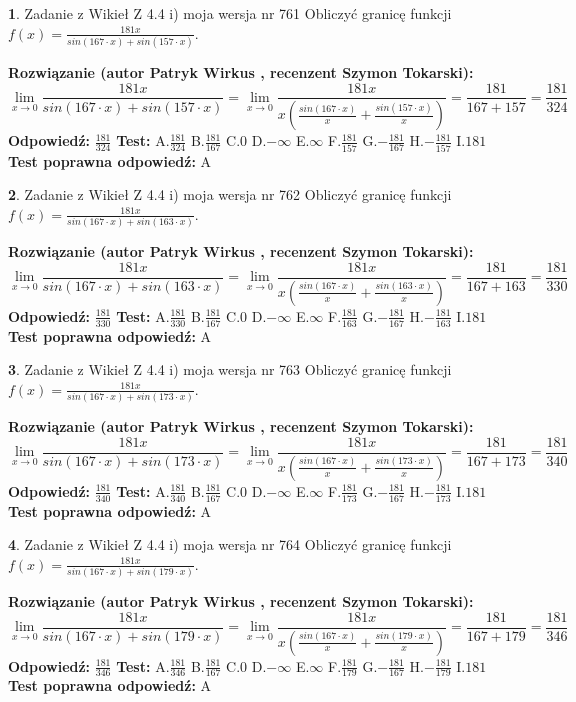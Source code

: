 \documentclass[12pt, a4paper]{article}
\theoremstyle{definition} %
\newtheorem{zad}{}
\newcommand{\zadStart}[1]{\begin{zad}#1\newline}
\newcommand{\zadStop}{\end{zad}}
\newcommand{\rozwStart}[2]{\noindent \textbf{Rozwiązanie (autor #1 , recenzent #2): }\newline}
\newcommand{\rozwStop}{\newline}
\newcommand{\odpStart}{\noindent \textbf{Odpowiedź:}\newline}
\newcommand{\odpStop}{\newline}
\newcommand{\testStart}{\noindent \textbf{Test:}\newline}
\newcommand{\testStop}{\newline}
\newcommand{\kluczStart}{\noindent \textbf{Test poprawna odpowiedź:}\newline}
\newcommand{\kluczStop}{\newline}
\begin{document}
\zadStart{Zadanie z Wikieł Z 4.4 i) moja wersja nr 761}
Obliczyć granicę funkcji $f(x)=\frac{181x}{sin(167\cdot x) +sin(157\cdot x)}$.
\zadStop
\rozwStart{Patryk Wirkus}{Szymon Tokarski}
$$\lim\limits_{x\to 0}\frac{181x}{sin(167\cdot x) +sin(157\cdot x)}=\lim\limits_{x\to 0}\frac{181x}{x(\frac{sin(167\cdot x)}{x}+\frac{sin(157\cdot x)}{x})}=\frac{181}{167+157} = \frac{181}{324}$$
\rozwStop
\odpStart
$\frac{181}{324}$
\odpStop
\testStart
A.$\frac{181}{324}$
B.$\frac{181}{167}$
C.$0$
D.$-\infty$
E.$\infty$
F.$\frac{181}{157}$
G.$-\frac{181}{167}$
H.$-\frac{181}{157}$
I.$181$
\testStop
\kluczStart
A
\kluczStop



\zadStart{Zadanie z Wikieł Z 4.4 i) moja wersja nr 762}
Obliczyć granicę funkcji $f(x)=\frac{181x}{sin(167\cdot x) +sin(163\cdot x)}$.
\zadStop
\rozwStart{Patryk Wirkus}{Szymon Tokarski}
$$\lim\limits_{x\to 0}\frac{181x}{sin(167\cdot x) +sin(163\cdot x)}=\lim\limits_{x\to 0}\frac{181x}{x(\frac{sin(167\cdot x)}{x}+\frac{sin(163\cdot x)}{x})}=\frac{181}{167+163} = \frac{181}{330}$$
\rozwStop
\odpStart
$\frac{181}{330}$
\odpStop
\testStart
A.$\frac{181}{330}$
B.$\frac{181}{167}$
C.$0$
D.$-\infty$
E.$\infty$
F.$\frac{181}{163}$
G.$-\frac{181}{167}$
H.$-\frac{181}{163}$
I.$181$
\testStop
\kluczStart
A
\kluczStop



\zadStart{Zadanie z Wikieł Z 4.4 i) moja wersja nr 763}
Obliczyć granicę funkcji $f(x)=\frac{181x}{sin(167\cdot x) +sin(173\cdot x)}$.
\zadStop
\rozwStart{Patryk Wirkus}{Szymon Tokarski}
$$\lim\limits_{x\to 0}\frac{181x}{sin(167\cdot x) +sin(173\cdot x)}=\lim\limits_{x\to 0}\frac{181x}{x(\frac{sin(167\cdot x)}{x}+\frac{sin(173\cdot x)}{x})}=\frac{181}{167+173} = \frac{181}{340}$$
\rozwStop
\odpStart
$\frac{181}{340}$
\odpStop
\testStart
A.$\frac{181}{340}$
B.$\frac{181}{167}$
C.$0$
D.$-\infty$
E.$\infty$
F.$\frac{181}{173}$
G.$-\frac{181}{167}$
H.$-\frac{181}{173}$
I.$181$
\testStop
\kluczStart
A
\kluczStop



\zadStart{Zadanie z Wikieł Z 4.4 i) moja wersja nr 764}
Obliczyć granicę funkcji $f(x)=\frac{181x}{sin(167\cdot x) +sin(179\cdot x)}$.
\zadStop
\rozwStart{Patryk Wirkus}{Szymon Tokarski}
$$\lim\limits_{x\to 0}\frac{181x}{sin(167\cdot x) +sin(179\cdot x)}=\lim\limits_{x\to 0}\frac{181x}{x(\frac{sin(167\cdot x)}{x}+\frac{sin(179\cdot x)}{x})}=\frac{181}{167+179} = \frac{181}{346}$$
\rozwStop
\odpStart
$\frac{181}{346}$
\odpStop
\testStart
A.$\frac{181}{346}$
B.$\frac{181}{167}$
C.$0$
D.$-\infty$
E.$\infty$
F.$\frac{181}{179}$
G.$-\frac{181}{167}$
H.$-\frac{181}{179}$
I.$181$
\testStop
\kluczStart
A
\kluczStop
\end{document}
